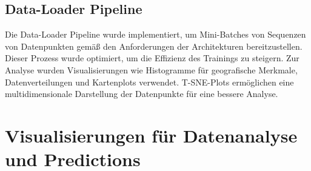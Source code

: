 \documentclass[manuscript,screen,review]{acmart}
\begin{document}
\subsection*{Data-Loader Pipeline}

Die Data-Loader Pipeline wurde implementiert, um Mini-Batches von Sequenzen von Datenpunkten gemäß den Anforderungen der Architekturen bereitzustellen. Dieser Prozess wurde optimiert, um die Effizienz des Trainings zu steigern. 
Zur Analyse wurden Visualisierungen wie Histogramme für geografische Merkmale, Datenverteilungen und Kartenplots verwendet. 
T-SNE-Plots ermöglichen eine multidimensionale Darstellung der Datenpunkte für eine bessere Analyse.

\section{Visualisierungen für Datenanalyse und Predictions}
\end{document}
